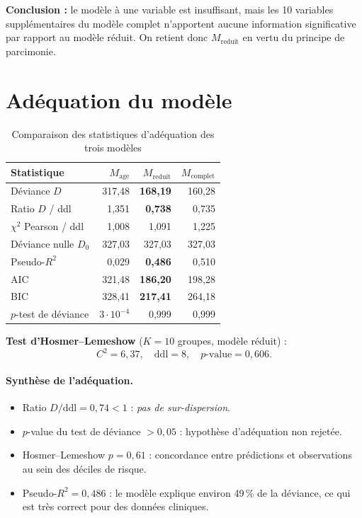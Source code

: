 \documentclass[11pt,a4paper,twoside]{report}
\theoremstyle{definition}
\begin{document}
\textbf{Conclusion :} le modèle à une variable est insuffisant, mais
les 10 variables supplémentaires du modèle complet n'apportent aucune
information significative par rapport au modèle réduit. On retient donc
$M_{\text{reduit}}$ en vertu du principe de parcimonie.

\section{Adéquation du modèle}

\begin{table}[H]
\centering
\caption{Comparaison des statistiques d'adéquation des trois modèles}
\label{tab:adequation}
\small
\begin{tabular}{lrrr}
\toprule
Statistique & $M_{\text{age}}$ & $M_{\text{reduit}}$ & $M_{\text{complet}}$ \\
\midrule
Déviance $D$               & 317,48  & \textbf{168,19} & 160,28 \\
Ratio $D$ / ddl            & 1,351   & \textbf{0,738}  & 0,735  \\
$\chi^2$ Pearson / ddl     & 1,008   & 1,091           & 1,225  \\
Déviance nulle $D_0$       & 327,03  & 327,03          & 327,03 \\
Pseudo-$R^2$               & 0,029   & \textbf{0,486}  & 0,510  \\
AIC                        & 321,48  & \textbf{186,20} & 198,28 \\
BIC                        & 328,41  & \textbf{217,41} & 264,18 \\
$p$-test de déviance       & $3\!\cdot\!10^{-4}$ & 0,999 & 0,999 \\
\bottomrule
\end{tabular}
\end{table}

\textbf{Test d'Hosmer--Lemeshow} ($K = 10$ groupes, modèle réduit) :
\[
  C^2 = 6{,}37, \quad \text{ddl} = 8, \quad p\text{-value} = 0{,}606.
\]

\paragraph{Synthèse de l'adéquation.}
\begin{itemize}\itemsep0.2em
  \item Ratio $D/\mathrm{ddl} = 0{,}74 < 1$ : \emph{pas de
    sur-dispersion}.
  \item $p$-value du test de déviance $> 0{,}05$ : hypothèse
    d'adéquation non rejetée.
  \item Hosmer--Lemeshow $p = 0{,}61$ : concordance entre prédictions et
    observations au sein des déciles de risque.
  \item Pseudo-$R^2 = 0{,}486$ : le modèle explique environ 49\,\% de
    la déviance, ce qui est très correct pour des données cliniques.
\end{itemize}
\end{document}
